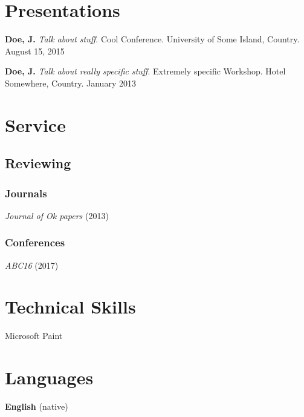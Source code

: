 \documentclass{article}
\begin{document}
\section{Presentations}

\begin{enumerate}[label={[\arabic*]}]

\item \textbf{Doe, J.} \emph{Talk about stuff}. Cool Conference. University of Some Island, Country. August 15, 2015

\item \textbf{Doe, J.} \emph{Talk about really specific stuff}. Extremely specific Workshop. Hotel Somewhere, Country. January 2013

\end{enumerate}

\section{Service}

\subsection{Reviewing}

\subsubsection{Journals}

\emph{Journal of Ok papers} (2013)

\subsubsection{Conferences}

\emph{ABC16} (2017)

\section{Technical Skills}

Microsoft Paint

\section{Languages}

\textbf{English} (native)
\end{document}
